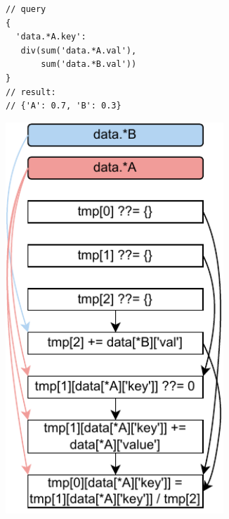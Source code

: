 \documentclass[runningheads]{llncs}
\begin{document}
\begin{figure}[t!]
\begin{subfigure}{\textwidth}
\begin{minipage}{0.25\textwidth}
\begin{lstlisting}[style=JavaScript, columns=flexible]
// query
{
  'data.*A.key': 
   div(sum('data.*A.val'),
       sum('data.*B.val')) 
}
// result:
// {'A': 0.7, 'B': 0.3}
\end{lstlisting}
\end{minipage}
\begin{minipage}{0.21\textwidth}
\centering
\includegraphics[width=0.9\textwidth]{images/intro_q3_ir.pdf}
\end{minipage}
\begin{minipage}{0.54\textwidth}

\end{minipage}
\end{subfigure}
\end{figure}
\end{document}

